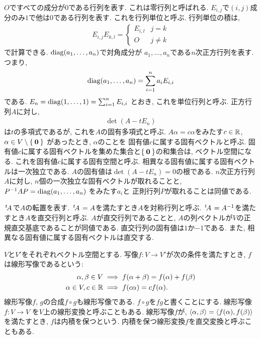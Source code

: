 $O$ですべての成分が$0$である行列を表す.
これは零行列と呼ばれる.
$E_{i,j}$で$(i,j)$成分のみ$1$で他は$0$である行列を表す.
これを行列単位と呼ぶ.
行列単位の積は,
\begin{align*}
  E_{i,j}E_{k,l}=
  \begin{cases}
    E_{i,l} & j=k\\
    O & j\neq k
  \end{cases}
\end{align*}
で計算できる.
$\operatorname{diag}(a_1,\ldots,a_n)$で対角成分が
$a_1,\ldots,a_n$である$n$次正方行列を表す.
つまり,
\begin{align*}
\operatorname{diag}(a_1,\ldots,a_n)=\sum_{i=1}^{n}a_iE_{i,i}
\end{align*}
である.
$E_n=\operatorname{diag}(1,\ldots,1)=\sum_{i=1}^{n}E_{i,i}$
とおき, これを単位行列と呼ぶ.
正方行列$A$に対し,
\begin{align*}
  \det(A-tE_n)
\end{align*}
は$t$の多項式であるが,
これを$A$の固有多項式と呼ぶ.
$A\alpha=c \alpha$をみたす$c\in \mathbb{R}$, $\alpha\in V\setminus\Set{\boldsymbol{0}}$
があったとき,
$\alpha$のことを
固有値$c$に属する固有ベクトルと呼ぶ.
固有値$c$に属する固有ベクトルを集めた集合と$\Set{\boldsymbol{0}}$の和集合は,
ベクトル空間になる.
これを固有値$c$に属する固有空間と呼ぶ.
相異なる固有値に属する固有ベクトルは一次独立である.
$A$の固有値は$\det(A-tE_n)=0$の根である.
$n$次正方行列$A$に対し,
$n$個の一次独立な固有ベクトルが取れることと,
$P^{-1}AP=\operatorname{diag}(a_1,\ldots,a_n)$
をみたす$a_i$と
正則行列$P$が取れることは同値である.

$\left.^{t}\!A\right.$で$A$の転置を表す.
$\left.^{t}\!A\right.=A$を満たすとき$A$を対称行列と呼ぶ.
$\left.^{t}\!A\right.=A^{-1}$を満たすとき$A$を直交行列と呼ぶ.
$A$が直交行列であることと,
$A$の列ベクトルが$V$の正規直交基底であることが同値である.
直交行列の固有値は$1$か$-1$である.
また,
相異なる固有値に属する固有ベクトルは直交する.


$V$と$V'$をそれぞれベクトル空間とする.
写像$f\colon V\to V'$が次の条件を満たすとき,
$f$は線形写像であるという:
\begin{align*}
  \alpha,\beta\in V &\implies f(\alpha+\beta)=f(\alpha)+f(\beta)\\
  \alpha\in V,c\in \mathbb{R} &\implies f(c\alpha)=cf(\alpha)  .
\end{align*}
線形写像$f$, $g$の合成$f\circ g$も線形写像である.
$f\circ g$を$fg$と書くことにする.
線形写像$f\colon V\to V$
を$V$上の線形変換と呼ぶこともある.
線形写像$f$が,
$\Braket{\alpha,\beta}=\Braket{f(\alpha),f(\beta)}$
を満たすとき,
$f$は内積を保つという.
内積を保つ線形変換$f$を直交変換と呼ぶこともある.


